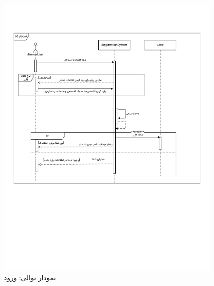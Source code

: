 \begin{figure}[ht!]
	\centering
	\includegraphics[scale=0.8, page=2]{figs/OOD-Sequence-1.pdf}
	\caption{نمودار توالی: ورود}
\end{figure}
\FloatBarrier
\newpage

